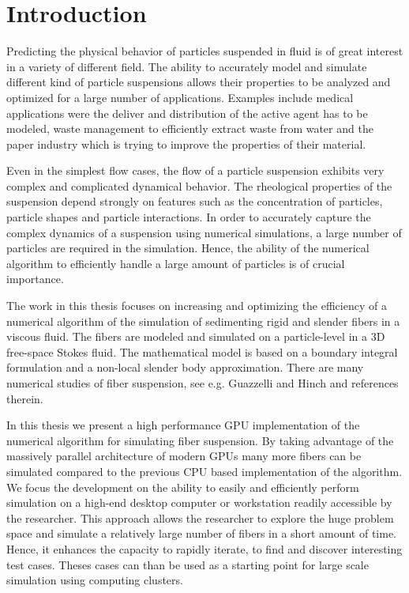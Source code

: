 \chapter{Introduction}

Predicting the physical behavior of particles suspended in fluid is of great interest in a variety of different field. The ability to accurately model and simulate different kind of particle suspensions allows their properties to be analyzed and optimized for a large number of applications. Examples include medical applications were the deliver and distribution of the active agent has to be modeled, waste management to efficiently extract waste from water and the paper industry which is trying to improve the properties of their material.

Even in the simplest flow cases, the flow of a particle suspension exhibits very complex and complicated dynamical behavior. The rheological properties of the suspension depend strongly on features such as the concentration of particles, particle shapes and particle interactions. In order to accurately capture the complex dynamics of a suspension using numerical simulations, a large number of particles are required in the simulation. Hence, the ability of the numerical algorithm to efficiently handle a large amount of particles is of crucial importance.

The work in this thesis focuses on increasing and optimizing the efficiency of a numerical algorithm of the simulation of sedimenting rigid and slender fibers in a viscous fluid. The fibers are modeled and simulated on a particle-level in a 3D free-space Stokes fluid. The mathematical model is based on a boundary integral formulation and a non-local slender body approximation\cite{Tornberg2006}. There are many numerical studies of fiber suspension, see e.g. Guazzelli and Hinch\cite{Guazzelli2011} and references therein.

In this thesis we present a high performance GPU implementation of the numerical algorithm for simulating fiber suspension. By taking advantage of the massively parallel architecture of modern GPUs many more fibers can be simulated compared to the previous CPU based implementation of the algorithm. We focus the development on the ability to easily and efficiently perform simulation on a high-end desktop computer or workstation readily accessible by the researcher. This approach allows the researcher to explore the huge problem space and simulate a relatively large number of fibers in a short amount of time. Hence, it enhances the capacity to rapidly iterate, to find and discover interesting test cases. Theses cases can than be used as a starting point for large scale simulation using computing clusters.

